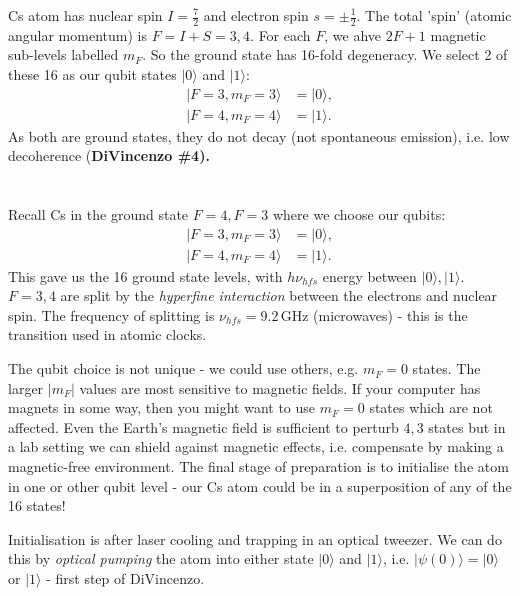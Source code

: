 \documentclass[lasers.tex]{subfiles}
\begin{document}
Cs atom has nuclear spin $I=\frac72$ and electron spin $s=\pm\frac12$.
The total 'spin' (atomic angular momentum) is $F=I+S=3,4$.
For each $F$, we ahve $2F+1$ magnetic sub-levels labelled $m_F$.
So the ground state has 16-fold degeneracy. 
We select 2 of these 16 as our qubit states $|0\rangle$ and $|1\rangle$:
\begin{align*}
    |F=3,m_F=3\rangle &= |0\rangle, \\
    |F=4,m_F=4\rangle &= |1\rangle. 
\end{align*}
As both are ground states, they do not decay (not spontaneous emission), i.e. low decoherence (\textbf{DiVincenzo \#4).}


\chapter{}
Recall Cs in the ground state $F=4,F=3$ where we choose our qubits:
\begin{align*}
    |F=3,m_F=3\rangle &= |0\rangle, \\
    |F=4,m_F=4\rangle &= |1\rangle. 
\end{align*}
This gave us the 16 ground state levels, with $h\nu_{hfs}$ energy between $|0\rangle,|1\rangle$.
$F=3,4$ are split by the \emph{hyperfine interaction} between the electrons and nuclear spin. 
The frequency of splitting is $\nu_{hfs}=9.2\,$GHz (microwaves) - this is the transition used in atomic clocks.

The qubit choice is not unique - we could use others, e.g. $m_F=0$ states.
The larger $|m_F|$ values are most sensitive to magnetic fields. 
If your computer has magnets in some way, then you might want to use $m_F=0$ states which are not affected.
Even the Earth's magnetic field is sufficient to perturb $4,3$ states but in a lab setting we can shield against magnetic effects, i.e. compensate by making a magnetic-free environment.
The final stage of preparation is to initialise the atom in one or other qubit level - our Cs atom could be in a superposition of any of the 16 states!

Initialisation is after laser cooling and trapping in an optical tweezer. 
We can do this by \emph{optical pumping} the atom into either state $|0\rangle$ and $|1\rangle$, i.e. $|\psi(0)\rangle=|0\rangle$ or $|1\rangle$ - first step of DiVincenzo. 
\end{document}
